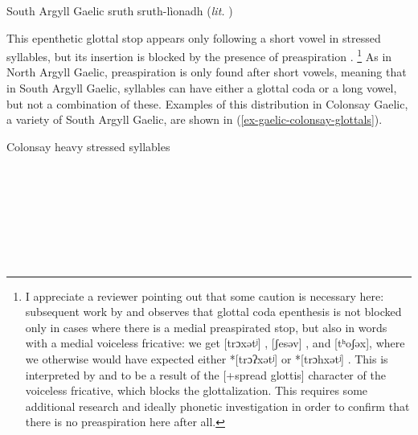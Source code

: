 \documentclass[output=paper,colorlinks,citecolor=brown]{langscibook}
\begin{document}
\ea South Argyll Gaelic \citep{jones2006}\label{ex-gaelic-stress-to-weight}
	\ea  sruth 		   \tab\relax [ˈsruʔ]		\tab {}
	\ex  sruth-lìonadh \tab{}	\tab {} (\textit{lit.} ) 
	\z
\z

This epenthetic glottal stop appears only following a short vowel in stressed syllables, but its insertion is blocked by the presence of preaspiration \citep{jones2006}.%
\footnote{I appreciate a reviewer pointing out that some caution is necessary here: subsequent work by \citet{morrison2019} and \citet{iosad2021} observes that glottal coda epenthesis is not blocked only in cases where there is a medial preaspirated stop, but also in words with a medial voiceless fricative: we get  [trɔxətʲ] ,  [ʃesəv] , and  [tʰoʃəx], where we otherwise would have expected either *[trɔʔxətʲ] or *[trɔhxətʲ] \citep{morrison2019}. This is interpreted by \citet{morrison2019} and \citet{iosad2021} to be a result of the [+spread glottis] character of the voiceless fricative, which blocks the glottalization. This requires some additional research and ideally phonetic investigation in order to confirm that there is no preaspiration here after all.}
As in North Argyll Gaelic, preaspiration is only found after short vowels, meaning that in South Argyll Gaelic, syllables can have either a glottal coda or a long vowel, but not a combination of these. Examples of this distribution in Colonsay Gaelic, a variety of South Argyll Gaelic, are shown in (\ref{ex-gaelic-colonsay-glottals}).%


\ea Colonsay heavy stressed syllables \citep{sgds,scouller2017}\label{ex-gaelic-colonsay-glottals}
	\ea	 {} \tab\relax [ˈkruːpan̥]   \tab {}\\
		   \tab\relax [ˈtʰoʔpər̥]   \tab {}\\
		   \tab\relax [ˈkohpan̥]    \tab {}
	\ex	 {} 	 \tab\relax [ˈpaːtə]	 \tab  {}\\
		  \tab\relax [ˈpraʔtan̥]   \tab {}\\
		  \tab{} \tab {}
	\ex	 {}  \tab\relax [ˈɣøːtʃɪ]	 \tab  {}\\   
		          \tab\relax [ˈøʔtʃɪ]	 \tab  {}\\
		           \tab\relax [ˈihtʃɪ] \tab {} 
	\ex	 {} 	\tab\relax [ˈfaːkal̥ʲ]	 \tab  {}\\
		      \tab\relax [ˈlˠaʔkan̥] 	 \tab  {}\\          
		       \tab\relax [ˈpʰaxkə] \tab {} 
	\z
\z
\end{document}
